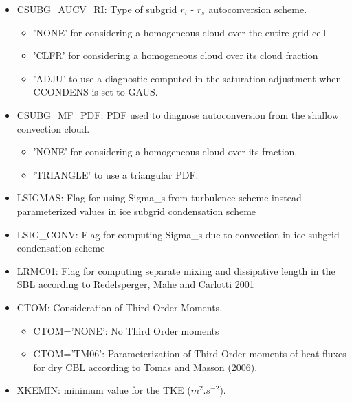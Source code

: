 \begin{itemize}
\item
{}
CSUBG\_AUCV\_RI: Type of subgrid $r_i$ - $r_s$ autoconversion scheme.
\begin{itemize}
\item  'NONE' for considering a homogeneous cloud over the entire grid-cell
\item 'CLFR' for considering a homogeneous cloud over its cloud fraction
\item 'ADJU' to use a diagnostic computed in the saturation adjustment when CCONDENS is set to GAUS.
\end{itemize}

\item
{}
CSUBG\_MF\_PDF: PDF used to diagnose autoconversion from the shallow convection cloud.
\begin{itemize}
\item  'NONE' for considering a homogeneous cloud over its fraction.
\item 'TRIANGLE' to use a triangular PDF.
\end{itemize}

\item
{}
LSIGMAS: Flag for using Sigma\_s from turbulence scheme instead parameterized values
in ice subgrid condensation scheme

\item
{}
LSIG\_CONV: Flag for computing Sigma\_s due to convection in ice subgrid 
condensation scheme

\item
{}
LRMC01: Flag for computing separate mixing and dissipative length
in the SBL according to Redelsperger, Mahe and Carlotti 2001

\item
{}
CTOM: Consideration of Third Order Moments.

\begin{itemize}
\item
CTOM='NONE': No Third Order moments                             
\item
CTOM='TM06': Parameterization of Third Order moments of heat fluxes for dry CBL
according to Tomas and Masson (2006).
\end{itemize}

\item
{}
XKEMIN: minimum value for the TKE ($m^{2}.s^{-2}$).


\end{itemize}
